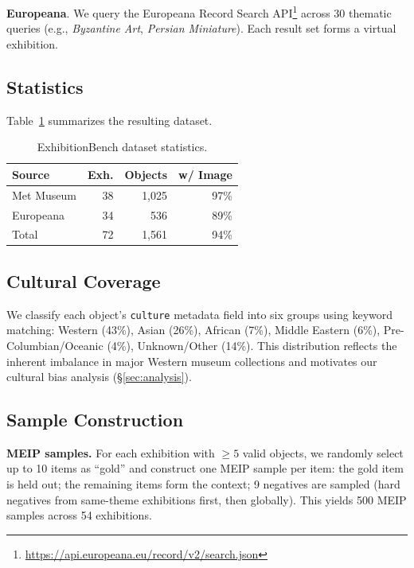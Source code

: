 \documentclass[11pt]{article}
\begin{document}
\noindent\textbf{Europeana}.
We query the Europeana Record Search API\footnote{
  \url{https://api.europeana.eu/record/v2/search.json}}
across 30 thematic queries (e.g., \textit{Byzantine Art}, \textit{Persian
Miniature}).
Each result set forms a virtual exhibition.

\subsection{Statistics}

Table~\ref{tab:data} summarizes the resulting dataset.

\begin{table}[h]
\centering
\small
\begin{tabular}{lrrr}
\toprule
\textbf{Source} & \textbf{Exh.} & \textbf{Objects} & \textbf{w/ Image} \\
\midrule
Met Museum   & 38 & 1,025 & 97\% \\
Europeana    & 34 & 536   & 89\% \\
\midrule
Total        & 72 & 1,561 & 94\% \\
\bottomrule
\end{tabular}
\caption{ExhibitionBench dataset statistics.}
\label{tab:data}
\end{table}

\subsection{Cultural Coverage}

We classify each object's \texttt{culture} metadata field into six groups
using keyword matching: Western (43\%), Asian (26\%), African (7\%),
Middle Eastern (6\%), Pre-Columbian/Oceanic (4\%), Unknown/Other (14\%).
This distribution reflects the inherent imbalance in major Western museum
collections and motivates our cultural bias analysis
(\S\ref{sec:analysis}).

\subsection{Sample Construction}

\noindent\textbf{MEIP samples.}
For each exhibition with $\geq 5$ valid objects, we randomly select up to 10
items as ``gold'' and construct one MEIP sample per item:
the gold item is held out; the remaining items form the context;
9 negatives are sampled (hard negatives from same-theme exhibitions first,
then globally).
This yields 500 MEIP samples across 54 exhibitions.
\end{document}
